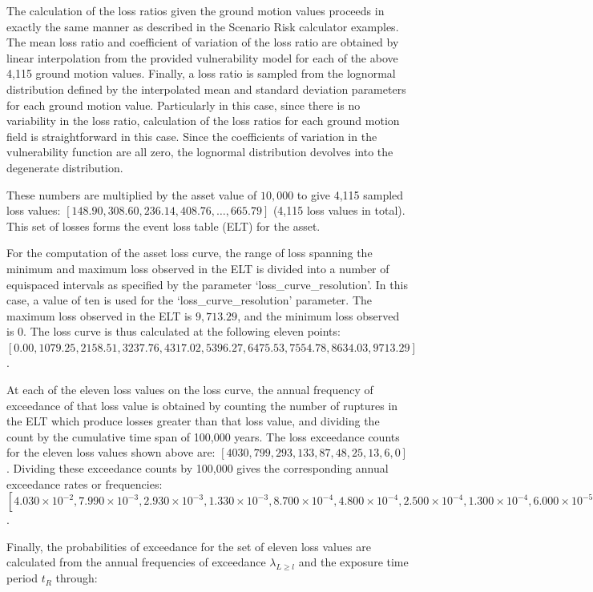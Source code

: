 The calculation of the loss ratios given the ground motion values proceeds in exactly the same manner as described in the Scenario Risk calculator examples. The mean loss ratio and coefficient of variation of the loss ratio are obtained by linear interpolation from the provided vulnerability model for each of the above 4,115 ground motion values. Finally, a loss ratio is sampled from the lognormal distribution defined by the interpolated mean and standard deviation parameters for each ground motion value. Particularly in this case, since there is no variability in the loss ratio, calculation of the loss ratios for each ground motion field is straightforward in this case. Since the coefficients of variation in the vulnerability function are all zero, the lognormal distribution devolves into the degenerate distribution.

These numbers are multiplied by the asset value of $10,000$ to give 4,115 sampled loss values: $[148.90, 308.60, 236.14, 408.76, \dots, 665.79]$ (4,115 loss values in total). This set of losses forms the event loss table (ELT) for the asset.

For the computation of the asset loss curve, the range of loss spanning the minimum and maximum loss observed in the ELT is divided into a number of equispaced intervals as specified by the parameter `loss\_curve\_resolution'. In this case, a value of ten is used for the `loss\_curve\_resolution' parameter. The maximum loss observed in the ELT is $9,713.29$, and the minimum loss observed is $0$. The loss curve is thus calculated at the following eleven points: $[0.00, 1079.25, 2158.51, 3237.76, 4317.02, 5396.27, 6475.53, 7554.78, 8634.03, 9713.29]$.

At each of the eleven loss values on the loss curve, the annual frequency of exceedance of that loss value is obtained by counting the number of ruptures in the ELT which produce losses greater than that loss value, and dividing the count by the cumulative time span of 100,000 years. The loss exceedance counts for the eleven loss values shown above are: $[4030, 799, 293, 133, 87, 48, 25, 13, 6, 0]$. Dividing these exceedance counts by 100,000 gives the corresponding annual exceedance rates or frequencies: $[4.030\times10^{-2}, 7.990\times10^{-3}, 2.930\times10^{-3}, 1.330\times10^{-3}, 8.700\times10^{-4}, 4.800\times10^{-4}, 2.500\times10^{-4}, 1.300\times10^{-4}, 6.000\times10^{-5}, 0.000]$.

Finally, the probabilities of exceedance for the set of eleven loss values are calculated from the annual frequencies of exceedance $\lambda_{L \geq l}$ and the exposure time period $t_R$ through:

